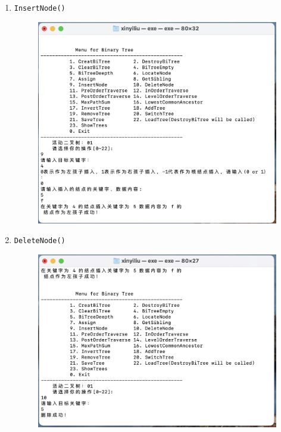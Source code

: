 \documentclass[supercite]{Experimental_Report}
\theoremstyle{definition}
\begin{document}
\begin{enumerate}
	\item \verb|InsertNode()|
		\begin{figure}[!htb]
			\includegraphics[width=0.8\linewidth]{images/img02/截屏2023-06-04 21.14.24.png}
		\end{figure}
		\FloatBarrier
	\newpage
	\item \verb|DeleteNode()|
		\begin{figure}[!htb]
			\includegraphics[width=0.8\linewidth]{images/img02/截屏2023-06-04 21.14.48.png}
		\end{figure}
	\FloatBarrier
	

\end{enumerate}
\end{document}
